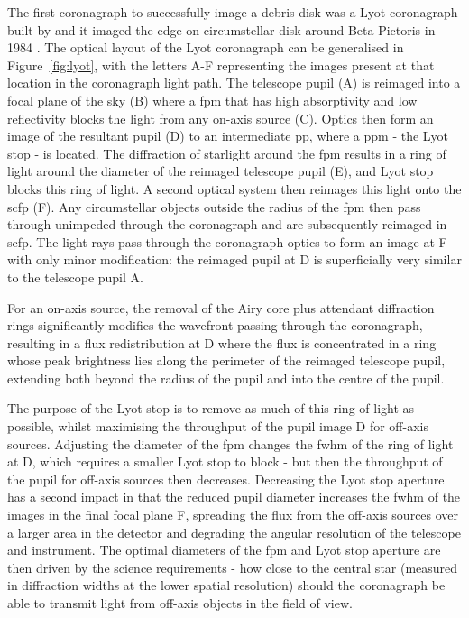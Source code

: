 \documentclass[letterpaper]{ar-1col}
\newcommand{\acc}[1]{\entry{\acs{#1}}{\acl{#1}}}
\begin{document}
The first coronagraph to successfully image a debris disk was a Lyot coronagraph built by \citet{Vilas87} and it imaged the edge-on circumstellar disk around Beta Pictoris in 1984 \citep{Smith84}.
%
The optical layout of the Lyot coronagraph can be generalised in Figure~\ref{fig:lyot}, with the letters A-F representing the images present at that location in the coronagraph light path.
%
The telescope pupil (A) is reimaged into a focal plane of the sky (B) where a \ac{fpm} that has high absorptivity and low reflectivity blocks the light from any on-axis source (C).
%
Optics then form an image of the resultant pupil (D) to an intermediate \ac{pp}, where a \ac{ppm} - the Lyot stop - is located.
%
The diffraction of starlight around the \ac{fpm} results in a ring of light around the diameter of the reimaged telescope pupil (E), and Lyot stop blocks this ring of light.
%
A second optical system then reimages this light onto the \ac{scfp}  (F).
%
%
Any circumstellar objects outside the radius of the \ac{fpm} then pass through unimpeded through the coronagraph and are subsequently reimaged in \ac{scfp}.
%
The light rays pass through the coronagraph optics to form an image at F with only minor modification: the reimaged pupil at D is superficially very similar to the telescope pupil A.

\begin{armarginnote}[]
\acc{fpm}
\acc{ppm}
\acc{scfp}
\end{armarginnote}

For an on-axis source, the removal of the Airy core plus attendant diffraction rings significantly modifies the wavefront passing through the coronagraph, resulting in a flux redistribution at D where the flux is concentrated in a ring whose peak brightness lies along the perimeter of the reimaged telescope pupil, extending both beyond the radius of the pupil and into the centre of the pupil.

The purpose of the Lyot stop is to remove as much of this ring of light as possible, whilst maximising the throughput of the pupil image D for off-axis sources.
%
Adjusting the diameter of the \ac{fpm} changes the \ac{fwhm} of the ring of light at D, which requires a smaller Lyot stop to block - but then the throughput of the pupil for off-axis sources then decreases.
%
Decreasing the Lyot stop aperture has a second impact in that the reduced pupil diameter increases the \ac{fwhm} of the images in the final focal plane F, spreading the flux from the off-axis sources over a larger area in the detector and degrading the angular resolution of the telescope and instrument.
%
The optimal diameters of the \ac{fpm} and Lyot stop aperture are then driven by the science requirements - how close to the central star (measured in diffraction widths at the lower spatial resolution) should the coronagraph be able to transmit light from off-axis objects in the field of view.
\end{document}
